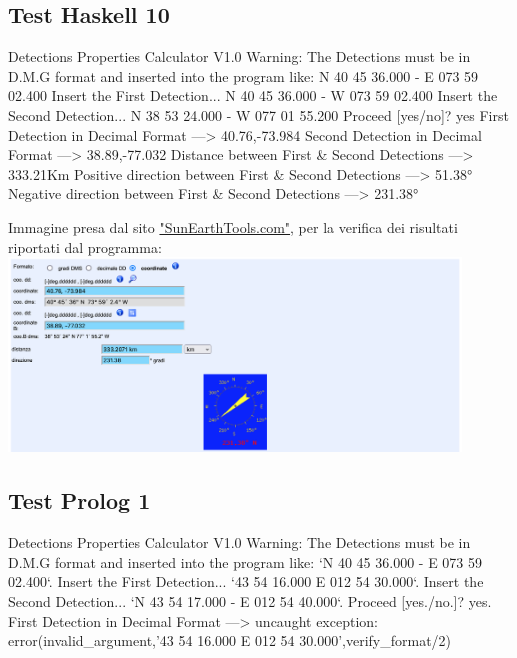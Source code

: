 \documentclass{article}
\begin{document}
\subsection*{Test Haskell 10}
	\begin{spverbatim}
		Detections Properties Calculator V1.0 
		Warning: The Detections must be in D.M.G format and inserted into the program like: N 40 45 36.000 - E 073 59 02.400
		Insert the First Detection...
		N 40 45 36.000 - W 073 59 02.400
		Insert the Second Detection...
		N 38 53 24.000 - W 077 01 55.200
		Proceed [yes/no]?
		yes
		First Detection in Decimal Format ---> 40.76,-73.984
		Second Detection in Decimal Format ---> 38.89,-77.032
		Distance between First & Second Detections ---> 333.21Km
		Positive direction between First & Second Detections ---> 51.38°
		Negative direction between First & Second Detections ---> 231.38°
	\end{spverbatim}
	\bigskip
	Immagine presa dal sito \href{https://www.sunearthtools.com/it/tools/distance.php}{"SunEarthTools.com"}, per la verifica dei risultati riportati dal programma:\\
	\includegraphics[width=0.9\textwidth]{Haskell_Tests/10-Calculation_of_Distant_Coordinates_Check}
	
\newpage
\subsection*{Test Prolog 1}
	\begin{spverbatim}
		Detections Properties Calculator V1.0
		Warning: The Detections must be in D.M.G format and inserted into the program like: `N 40 45 36.000 - E 073 59 02.400`.
		Insert the First Detection...
		`43 54 16.000  E 012 54 30.000`.
		Insert the Second Detection...
		`N 43 54 17.000 - E 012 54 40.000`.
		Proceed [yes./no.]?
		yes.
		First Detection in Decimal Format ---> 
		uncaught exception: error(invalid_argument,'43 54 16.000  E 012 54 30.000',verify_format/2)
	\end{spverbatim}
\end{document}
